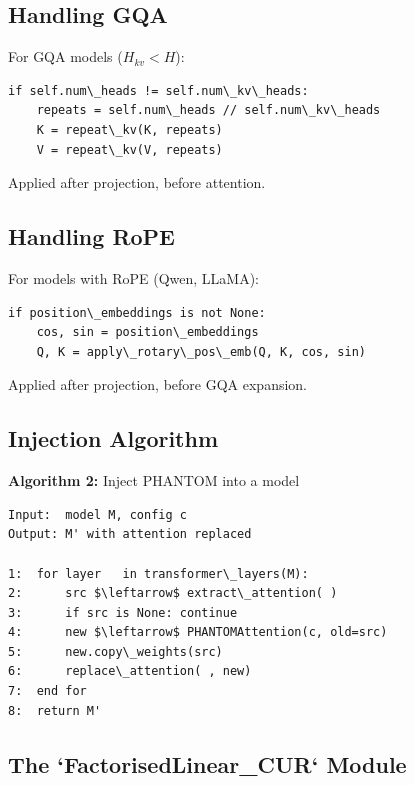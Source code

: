 \subsection{Handling GQA}

For GQA models ($H_{kv} < H$):

\begin{lstlisting}
if self.num\_heads != self.num\_kv\_heads:
    repeats = self.num\_heads // self.num\_kv\_heads
    K = repeat\_kv(K, repeats)
    V = repeat\_kv(V, repeats)
\end{lstlisting}

Applied after projection, before attention.

\subsection{Handling RoPE}

For models with RoPE (Qwen, LLaMA):

\begin{lstlisting}
if position\_embeddings is not None:
    cos, sin = position\_embeddings
    Q, K = apply\_rotary\_pos\_emb(Q, K, cos, sin)
\end{lstlisting}

Applied after projection, before GQA expansion.

\subsection{Injection Algorithm}

\textbf{Algorithm 2:} Inject PHANTOM into a model
\begin{lstlisting}
Input:  model M, config c
Output: M' with attention replaced

1:  for layer   in transformer\_layers(M):
2:      src $\leftarrow$ extract\_attention( )
3:      if src is None: continue
4:      new $\leftarrow$ PHANTOMAttention(c, old=src)
5:      new.copy\_weights(src)
6:      replace\_attention( , new)
7:  end for
8:  return M'
\end{lstlisting}

\subsection{The `FactorisedLinear\_CUR` Module}

